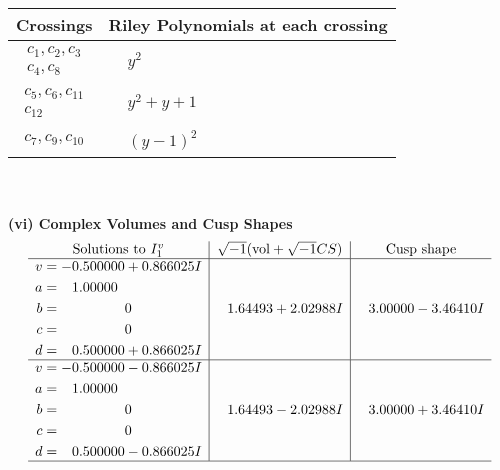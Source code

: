\documentclass[1p]{elsarticle_modified}
\theoremstyle{definition}
\newcommand{\I}{\sqrt{-1}}
\begin{document}
\begin{tabular}{m{50pt}|m{274pt}}
Crossings & \hspace{64pt}Riley Polynomials at each crossing \\
\hline $$\begin{aligned}c_{1},c_{2},c_{3}\\c_{4},c_{8}\end{aligned}$$&$\begin{aligned}
&y^2
\end{aligned}$\\
\hline $$\begin{aligned}c_{5},c_{6},c_{11}\\c_{12}\end{aligned}$$&$\begin{aligned}
&y^2+y+1
\end{aligned}$\\
\hline $$\begin{aligned}c_{7},c_{9},c_{10}\end{aligned}$$&$\begin{aligned}
&(y-1)^2
\end{aligned}$\\
\hline
\end{tabular}\\~\\
\newpage\flushleft \textbf{(vi) Complex Volumes and Cusp Shapes}
$$\begin{array}{c|c|c}  
\text{Solutions to }I^v_{1}& \I (\text{vol} + \sqrt{-1}CS) & \text{Cusp shape}\\
 \hline 
\begin{aligned}
v &= -0.500000 + 0.866025 I \\
a &= \phantom{-}1.00000\phantom{ +0.000000I} \\
b &= \phantom{-0.000000 } 0 \\
c &= \phantom{-0.000000 } 0 \\
d &= \phantom{-}0.500000 + 0.866025 I\end{aligned}
 & \phantom{-}1.64493 + 2.02988 I & \phantom{-}3.00000 - 3.46410 I \\ \hline\begin{aligned}
v &= -0.500000 - 0.866025 I \\
a &= \phantom{-}1.00000\phantom{ +0.000000I} \\
b &= \phantom{-0.000000 } 0 \\
c &= \phantom{-0.000000 } 0 \\
d &= \phantom{-}0.500000 - 0.866025 I\end{aligned}
 & \phantom{-}1.64493 - 2.02988 I & \phantom{-}3.00000 + 3.46410 I\\
 \hline 
 \end{array}$$\newpage\newpage\renewcommand{\arraystretch}{1}
\end{document}
